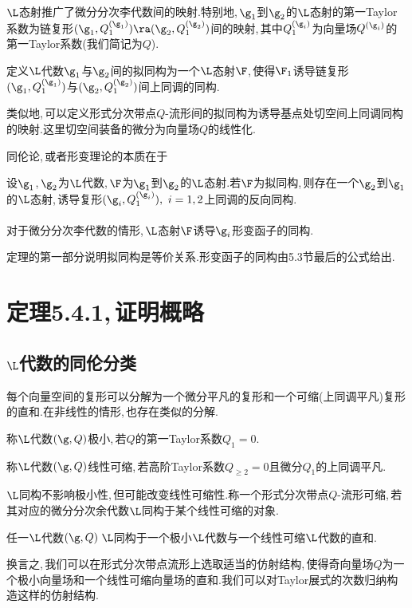 $\L$态射推广了微分分次李代数间的映射.特别地,\,$\g_1$到$\g_2$的$\L$态射的第一Taylor系数为链复形$(\g_1,Q_1^{(\g_1)})\ra(\g_2,Q_1^{(\g_2)})$间的映射,\,其中$Q_1^{(\g_i)}$为向量场$Q^{(\g_i)}$的第一Taylor系数(我们简记为$Q$).

定义$\L$代数$\g_1$与$\g_2$间的拟同构为一个$\L$态射$\F$,\,使得$\F_1$诱导链复形$(\g_1,Q_1^{(\g_1)})$与$(\g_2,Q_1^{(\g_2)})$间上同调的同构.

类似地,\,可以定义形式分次带点$Q$-流形间的拟同构为诱导基点处切空间上同调同构的映射.这里切空间装备的微分为向量场$Q$的线性化.

同伦论,\,或者形变理论的本质在于

\begin{thm}
设$\g_1$,\,$\g_2$为$\L$代数,\,$\F$为$\g_1$到$\g_2$的$\L$态射.若$\F$为拟同构,\,则存在一个$\g_2$到$\g_1$的$\L$态射,\,诱导复形$(\g_i,Q_1^{(\g_i)}),\,\,i=1,2$上同调的反向同构.
\\
\\
对于微分分次李代数的情形,\,$\L$态射$\F$诱导$\g_i$形变函子的同构.
\end{thm}
定理的第一部分说明拟同构是等价关系.形变函子的同构由5.3节最后的公式给出.




\section{定理5.4.1,\,证明概略}
\subsection{$\L$代数的同伦分类}

每个向量空间的复形可以分解为一个微分平凡的复形和一个可缩(上同调平凡)复形的直和.在非线性的情形,\,也存在类似的分解.

称$\L$代数$(\g,Q)$极小,\,若$Q$的第一Taylor系数$Q_1=0$.

称$\L$代数$(\g,Q)$线性可缩,\,若高阶Taylor系数$Q_{\ge 2}=0$且微分$Q_1$的上同调平凡.

$\L$同构不影响极小性,\,但可能改变线性可缩性.称一个形式分次带点$Q$-流形可缩,\,若其对应的微分分次余代数$\L$同构于某个线性可缩的对象.

\begin{lem}
任一$\L$代数$(\g,Q)$\,$\L$同构于一个极小$\L$代数与一个线性可缩$\L$代数的直和.
\end{lem}

换言之,\,我们可以在形式分次带点流形上选取适当的仿射结构,\,使得奇向量场$Q$为一个极小向量场和一个线性可缩向量场的直和.我们可以对Taylor展式的次数归纳构造这样的仿射结构.

